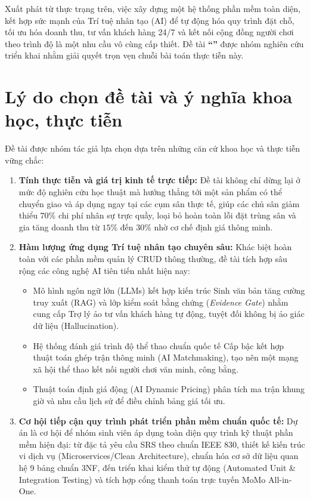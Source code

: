 Xuất phát từ thực trạng trên, việc xây dựng một hệ thống phần mềm toàn diện, kết hợp sức mạnh của Trí tuệ nhân tạo (AI) để tự động hóa quy trình đặt chỗ, tối ưu hóa doanh thu, tư vấn khách hàng 24/7 và kết nối cộng đồng người chơi theo trình độ là một nhu cầu vô cùng cấp thiết. Đề tài \textbf{``\reporttitle''} được nhóm nghiên cứu triển khai nhằm giải quyết trọn vẹn chuỗi bài toán thực tiễn này.

\section{Lý do chọn đề tài và ý nghĩa khoa học, thực tiễn}
\label{sec:lydo}

Đề tài được nhóm tác giả lựa chọn dựa trên những căn cứ khoa học và thực tiễn vững chắc:
\begin{enumerate}[label=\arabic*)]
    \item \textbf{Tính thực tiễn và giá trị kinh tế trực tiếp:} Đề tài không chỉ dừng lại ở mức độ nghiên cứu học thuật mà hướng thẳng tới một sản phẩm có thể chuyển giao và áp dụng ngay tại các cụm sân thực tế, giúp các chủ sân giảm thiểu $70\%$ chi phí nhân sự trực quầy, loại bỏ hoàn toàn lỗi đặt trùng sân và gia tăng doanh thu từ $15\%$ đến $30\%$ nhờ cơ chế định giá thông minh.
    \item \textbf{Hàm lượng ứng dụng Trí tuệ nhân tạo chuyên sâu:} Khác biệt hoàn toàn với các phần mềm quản lý CRUD thông thường, đề tài tích hợp sâu rộng các công nghệ AI tiên tiến nhất hiện nay:
    \begin{itemize}
        \item Mô hình ngôn ngữ lớn (LLMs) kết hợp kiến trúc Sinh văn bản tăng cường truy xuất (RAG) và lớp kiểm soát bằng chứng (\textit{Evidence Gate}) nhằm cung cấp Trợ lý ảo tư vấn khách hàng tự động, tuyệt đối không bị ảo giác dữ liệu (Hallucination).
        \item Hệ thống đánh giá trình độ thể thao chuẩn quốc tế Cấp bậc kết hợp thuật toán ghép trận thông minh (AI Matchmaking), tạo nên một mạng xã hội thể thao kết nối người chơi văn minh, công bằng.
        \item Thuật toán định giá động (AI Dynamic Pricing) phân tích ma trận khung giờ và nhu cầu lịch sử để điều chỉnh bảng giá tối ưu.
    \end{itemize}
    \item \textbf{Cơ hội tiếp cận quy trình phát triển phần mềm chuẩn quốc tế:} Dự án là cơ hội để nhóm sinh viên áp dụng toàn diện quy trình kỹ thuật phần mềm hiện đại: từ đặc tả yêu cầu SRS theo chuẩn IEEE 830, thiết kế kiến trúc vi dịch vụ (Microservices/Clean Architecture), chuẩn hóa cơ sở dữ liệu quan hệ 9 bảng chuẩn 3NF, đến triển khai kiểm thử tự động (Automated Unit \& Integration Testing) và tích hợp cổng thanh toán trực tuyến MoMo All-in-One.
\end{enumerate}


